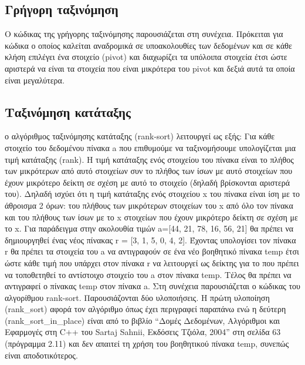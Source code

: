 



\subsection{Γρήγορη ταξινόμηση}
Ο κώδικας της γρήγορης ταξινόμησης  παρουσιάζεται στη συνέχεια. Πρόκειται για κώδικα ο οποίος καλείται αναδρομικά σε υποακολουθίες των δεδομένων και σε κάθε κλήση επιλέγει ένα στοιχείο (pivot) και διαχωρίζει τα υπόλοιπα στοιχεία έτσι ώστε αριστερά να είναι τα στοιχεία που είναι μικρότερα του pivot και δεξιά αυτά τα οποία είναι μεγαλύτερα. 







\subsection{Ταξινόμηση κατάταξης}
ο αλγόριθμος ταξινόμησης κατάταξης (rank-sort) λειτουργεί ως εξής: Για κάθε στοιχείο του δεδομένου πίνακα a που επιθυμούμε να ταξινομήσουμε υπολογίζεται μια τιμή κατάταξης (rank). Η τιμή κατάταξης ενός στοιχείου του πίνακα είναι το πλήθος των μικρότερων από αυτό στοιχείων συν το πλήθος των ίσων με αυτό στοιχείων που έχουν μικρότερο δείκτη σε σχέση με αυτό το στοιχείο (δηλαδή βρίσκονται αριστερά του).  Δηλαδή ισχύει ότι η τιμή κατάταξης ενός στοιχείου x του πίνακα είναι ίση με το άθροισμα 2 όρων: του πλήθους των μικρότερων στοιχείων του x από όλο τον πίνακα  και του πλήθους των ίσων με το x στοιχείων που έχουν μικρότερο δείκτη σε σχέση με το x. Για παράδειγμα στην ακολουθία τιμών a=[44, 21, 78, 16, 56, 21] θα πρέπει να δημιουργηθεί ένας νέος πίνακας r = [3, 1, 5, 0, 4, 2]. Έχοντας υπολογίσει τον πίνακα r θα πρέπει τα στοιχεία του a να αντιγραφούν σε ένα νέο βοηθητικό πίνακα temp έτσι ώστε κάθε τιμή που υπάρχει στον πίνακα r να λειτουργεί ως δείκτης για το που πρέπει να τοποθετηθεί το αντίστοιχο στοιχείο του a στον πίνακα temp. Τέλος θα πρέπει να αντιγραφεί ο πίνακας temp στον πίνακα a.
Στη συνέχεια παρουσιάζεται ο κώδικας του αλγορίθμου rank-sort. Παρουσιάζονται δύο υλοποιήσεις. Η πρώτη υλοποίηση (rank\_sort) αφορά τον αλγόριθμο όπως έχει περιγραφεί παραπάνω ενώ η δεύτερη (rank\_sort\_in\_place) είναι από το βιβλίο ``Δομές Δεδομένων, Αλγόριθμοι και Εφαρμογές στη C++ του Sartaj Sahnii, Εκδόσεις Τζιόλα, 2004'' στη σελίδα 63 (πρόγραμμα 2.11) και δεν απαιτεί τη χρήση του βοηθητικού πίνακα temp, συνεπώς είναι αποδοτικότερος. 

